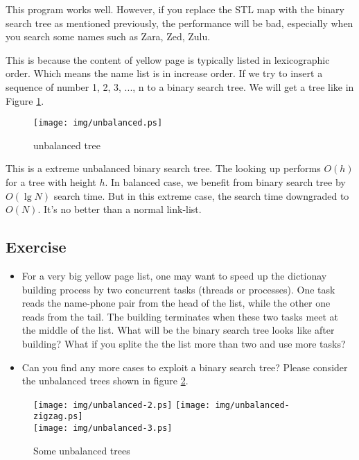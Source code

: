 \documentclass{article}
\begin{document}
This program works well. However, if you replace the STL map 
with the binary search tree as mentioned previously, the 
performance will be bad, especially when you search some names such
as Zara, Zed, Zulu.

This is because the content of yellow page is typically listed
in lexicographic order. Which means the name list is in increase
order. If we try to insert a sequence of number 1, 2, 3, ..., n 
to a binary search tree. We will get a tree like in Figure \ref{fig:unbalanced-tree}.

\begin{figure}[htbp]
       \begin{center}
	\texttt{[image: img/unbalanced.ps]}
        \caption{unbalanced tree} \label{fig:unbalanced-tree}
       \end{center}
\end{figure}

This is a extreme unbalanced binary search tree. The looking up performs
$O(h)$ for a tree with height $h$. In balanced case, we benefit from 
binary search tree by $O(\lg N)$ search time. But in this extreme case, 
the search time downgraded to $O(N)$. It's no better than a normal link-list.

\subsection*{Exercise}

\begin{itemize}
\item For a very big yellow page list, one may want to speed up the
dictionay building process by two concurrent tasks (threads or processes).
One task reads the name-phone pair from the head of the list, while the
other one reads from the tail. The building terminates when these
two tasks meet at the middle of the list. What will be the binary
search tree looks like after building? What if you splite the the
list more than two and use more tasks?

\item Can you find any more cases to exploit a binary search tree?
Please consider the unbalanced trees shown in figure 
\ref{fig:unbalanced-trees}.
\end{itemize}

\begin{figure}[htbp]
       \begin{center}
       \texttt{[image: img/unbalanced-2.ps]} \texttt{[image: img/unbalanced-zigzag.ps]} \\
       \texttt{[image: img/unbalanced-3.ps]} 
       \caption{Some unbalanced trees} \label{fig:unbalanced-trees}
       \end{center}
\end{figure}
\end{document}
